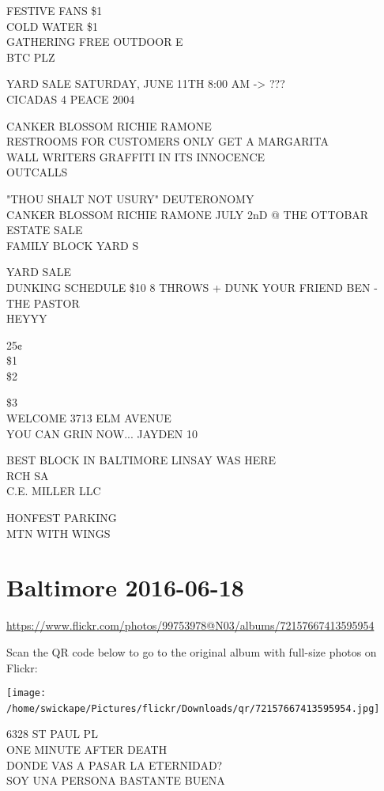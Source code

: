 \documentclass[10pt,letterpaper]{article}
\begin{document}
FESTIVE FANS \$1\\
COLD WATER \$1\\
GATHERING FREE OUTDOOR E\\
BTC PLZ

YARD SALE SATURDAY, JUNE 11TH 8:00 AM {-}> ???\\
CICADAS 4 PEACE 2004

CANKER BLOSSOM RICHIE RAMONE\\
RESTROOMS FOR CUSTOMERS ONLY GET A MARGARITA\\
WALL WRITERS GRAFFITI IN ITS INNOCENCE\\
OUTCALLS

"THOU SHALT NOT USURY" DEUTERONOMY\\
CANKER BLOSSOM RICHIE RAMONE JULY 2nD @ THE OTTOBAR\\
ESTATE SALE\\
FAMILY BLOCK YARD S

YARD SALE\\
DUNKING SCHEDULE \$10 8 THROWS + DUNK YOUR FRIEND BEN {-} THE PASTOR\\
HEYYY

25¢\\
\$1\\
\$2

\$3\\
WELCOME 3713 ELM AVENUE\\
YOU CAN GRIN NOW... JAYDEN 10

BEST BLOCK IN BALTIMORE LINSAY WAS HERE\\
RCH SA\\
C.E. MILLER LLC

HONFEST PARKING\\
MTN WITH WINGS
\

\section*{Baltimore 2016-06-18}

\url{https://www.flickr.com/photos/99753978@N03/albums/72157667413595954}

Scan the QR code below to go to the original album with full-size photos on Flickr:

\texttt{[image: /home/swickape/Pictures/flickr/Downloads/qr/72157667413595954.jpg]}
\

6328 ST PAUL PL\\
ONE MINUTE AFTER DEATH\\
DONDE VAS A PASAR LA ETERNIDAD?\\
SOY UNA PERSONA BASTANTE BUENA
\end{document}
